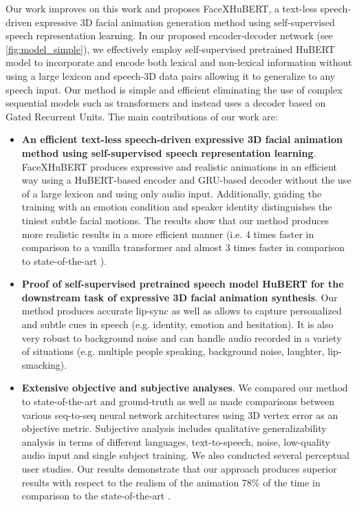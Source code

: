 \documentclass[10pt,twocolumn,letterpaper]{article}
\begin{document}
Our work improves on this work and proposes FaceXHuBERT, a text-less speech-driven expressive 3D facial animation generation method using self-supervised speech representation learning. In our proposed encoder-decoder network (see \cref{fig:model_simple}), we effectively employ self-supervised pretrained HuBERT model to incorporate and encode both lexical and non-lexical information without using a large lexicon and speech-3D data pairs allowing it to generalize to any speech input.  Our method is simple and efficient eliminating the use of complex sequential models such as transformers and instead uses a decoder based on Gated Recurrent Units. 
The main contributions of our work are: 

\begin{itemize}
\item \textbf{An efficient text-less speech-driven expressive 3D facial animation method using self-supervised speech representation learning}. FaceXHuBERT produces expressive and realistic animations in an efficient way using a HuBERT-based encoder and GRU-based decoder without the use of a large lexicon and using only audio input. Additionally, guiding the training with an emotion condition and speaker identity distinguishes the tiniest subtle facial motions. The results show that our method produces more realistic results in a more efficient manner (i.e. 4 times faster in comparison to a vanilla transformer and almost 3 times faster in comparison to state-of-the-art \cite{faceformer2022}).
    \item \textbf{Proof of self-supervised pretrained speech model HuBERT \cite{HuBERT} for the downstream task of expressive 3D facial animation synthesis}. Our method produces accurate lip-sync as well as allows to capture personalized and subtle cues in speech (e.g. identity, emotion and hesitation). It is also very robust to background noise and can handle audio recorded in a variety of situations (e.g. multiple people speaking, background noise, laughter, lip-smacking).
    \item \textbf{Extensive objective and subjective analyses}. We compared our method to state-of-the-art and ground-truth as well as made comparisons between various seq-to-seq neural network architectures using 3D vertex error as an objective metric. Subjective analysis includes qualitative generalizability analysis in terms of different languages, text-to-speech, noise, low-quality audio input and single subject training. We also conducted several perceptual user studies. Our results demonstrate that our approach produces superior results with respect to the realism of the animation 78\% of the time in comparison to the state-of-the-art \cite{faceformer2022}.
\end{itemize}
\end{document}
